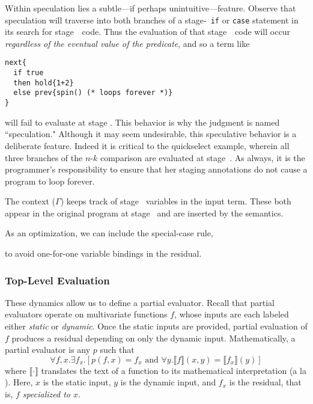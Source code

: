 Within speculation lies a subtle---if perhaps unintuitive---feature.  
Observe that speculation will traverse into both branches of a stage-\bbtwo\ {\tt if} or {\tt case} 
statement in its search for stage~\bbone\ code. 
Thus the evaluation of that stage~\bbone\ code will occur {\em regardless of the eventual value of the predicate},
and so a term like 
\begin{lstlisting} 
next{
  if true 
  then hold{1+2} 
  else prev{spin() (* loops forever *)}
}
\end{lstlisting}
will fail to evaluate at stage \bbone.
This behavior is why the judgment is named ``speculation."
Although it may seem undesirable, this speculative behavior is a deliberate feature.
Indeed it is critical to the quickselect example, 
wherein all three branches of the $n$-$k$ comparison are evaluated at stage~\bbone.
As always, it is the programmer's responsibility to ensure that her staging annotations 
do not cause a program to loop forever.  

The context ($\Gamma$) keeps track of stage \bbtwo\ variables in the input term. 
These both appear in the original program at stage \bbtwo\ and are inserted by the semantics.

As an optimization, we can include the special-case rule,
\begin{mathpar}
\end{mathpar}
to avoid one-for-one variable bindings in the residual.

\subsubsection {Top-Level Evaluation}
\label{sec:partialeval}

These dynamics allow us to define a partial evaluator.
Recall that partial evaluators operate on multivariate functions $f$, whose
inputs are each labeled either {\em static} or {\em dynamic}. Once the static
inputs are provided, partial evaluation of $f$ produces a residual depending on
only the dynamic input. Mathematically, a partial evaluator is any $p$ such
that
\[
	\forall f,x. \exists f_x. [p(f,x) = f_x \text{ and } \forall y.\llbracket f \rrbracket(x,y)=\llbracket f_x \rrbracket(y)]
\]
where $\llbracket \cdot \rrbracket$ translates the text of a function to its
mathematical interpretation (a la \cite{jones96}). Here, $x$ is the static
input, $y$ is the dynamic input, and $f_x$ is the residual, that is, \emph{$f$
specialized to $x$}.

